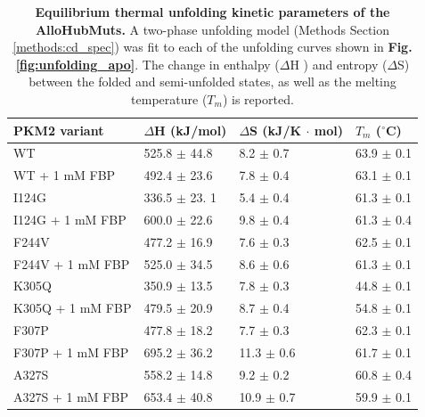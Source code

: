 \begin{table}[hbt]
\centering
\caption[Equilibrium thermal unfolding kinetic parameters of the AlloHubMuts.] {\textbf{Equilibrium thermal unfolding kinetic parameters of the AlloHubMuts.} A two-phase unfolding model (Methods Section \ref{methods:cd_spec}) was fit to each of the unfolding curves shown in \textbf{Fig. \ref{fig:unfolding_apo}}. The change in enthalpy ($\Delta$H ) and entropy ($\Delta$S) between the folded and semi-unfolded states, as well as the melting temperature ($T_{m}$) is reported.}
\label{tab:unfolding_kinetics}
\begin{tabular}{@{}llll@{}}
\toprule
PKM2 variant & $\Delta$H (kJ/mol) 		& $\Delta$S (kJ/K $\cdot$ mol) & $T_{m}$ ($^\circ$C) \\ \midrule
WT        					&  525.8 $\pm$  44.8        &         8.2   $\pm$  0.7               &      63.9 $\pm$  0.1       \\
WT + 1 mM FBP      &  492.4 $\pm$  23.6        &         7.8   $\pm$  0.4               &      63.1 $\pm$  0.1       \\ \midrule
I124G    					&  336.5  $\pm$ 23. 1        &         5.4   $\pm$ 0.4                &     	61.3  $\pm$  0.1       \\
I124G + 1 mM FBP 	&  600.0  $\pm$ 22.6        &         9.8  $\pm$ 0.4                &     	61.3  $\pm$  0.4       \\ \midrule
F244V   					&  477.2  $\pm$ 16.9         &         7.6  $\pm$ 0.3                 &      62.5 $\pm$ 0.1        \\ 
F244V + 1 mM FBP 	&  525.0  $\pm$ 34.5         &         8.6  $\pm$ 0.6                &      61.3 $\pm$ 0.1        \\ \midrule
K305Q  					&  350.9  $\pm$ 13.5        &         7.8  $\pm$ 0.3                 &      44.8 $\pm$ 0.1        \\ 
K305Q + 1 mM FBP   &  479.5  $\pm$ 20.9        &         8.7 $\pm$ 0.4                 &      54.8 $\pm$ 0.1        \\ \midrule
F307P   					&  477.8  $\pm$ 18.2        &         7.7 $\pm$ 0.3                 &      62.3 $\pm$ 0.1        \\ 
F307P + 1 mM FBP	&  695.2  $\pm$ 36.2        &         11.3 $\pm$ 0.6                 &      61.7 $\pm$ 0.1        \\ \midrule
A327S   					&  558.2  $\pm$ 14.8        &         9.2 $\pm$ 0.2                 &      60.8 $\pm$ 0.4        \\ 
A327S + 1 mM FBP	&  653.4  $\pm$ 40.8        &         10.9 $\pm$ 0.7                 &      59.9 $\pm$ 0.1        \\ \midrule

\end{tabular}
\end{table}
